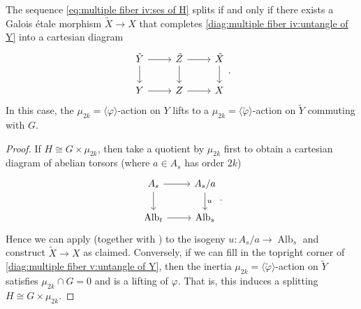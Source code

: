 \documentclass[reqno, letterpaper]{amsart}
\numberwithin{equation}{subsection}
\let\to\longrightarrow
\DeclareMathOperator{\Alb}{Alb}
\begin{document}
			\begin{lemma} \label{lem:multiple fiber iv:untangle of X}
				The sequence \eqref{eq:multiple fiber iv:ses of H} splits if and only if there exists a Galois \'etale morphism $\tilde X \to X$ that completes \eqref{diag:multiple fiber iv:untangle of Y} into a cartesian diagram
				\[\begin{tikzcd}
					\tilde Y \arrow[r] \arrow[d] & \tilde Z \arrow[r] \arrow[d] & \tilde X \arrow[d] \\
					Y \arrow[r] & Z \arrow[r] & X
				\end{tikzcd}.\]
				In this case, the $\mu_{2k} = \langle \varphi \rangle$-action on $Y$ lifts to a $\mu_{2k} = \langle \tilde \varphi \rangle$-action on $\tilde Y$ commuting with $G$.
			\end{lemma}
			\begin{proof}
				If $H \cong G \times \mu_{2k}$, then take a quotient by $\mu_{2k}$ first to obtain a cartesian diagram of abelian torsors (where $a \in A_s$ has order $2k$)
				\[\begin{tikzcd}
					A_s \arrow[r] \arrow[d] & A_s/a \arrow[d, "u"] \\
					\Alb_t \arrow[r] & \Alb_s
				\end{tikzcd}.\]
				Hence we can apply  (together with ) to the isogeny $u : A_s/a \to \Alb_s$ and construct $\tilde X \to X$ as claimed. Conversely, if we can fill in the topright corner of \eqref{diag:multiple fiber v:untangle of Y}, then the inertia $\mu_{2k} = \langle \tilde \varphi \rangle$-action on $\tilde Y$ satisfies $\mu_{2k} \cap G = 0$ and is a lifting of $\varphi$. That is, this induces a splitting $H \cong G \times \mu_{2k}$.
			\end{proof}
			
\end{document}
